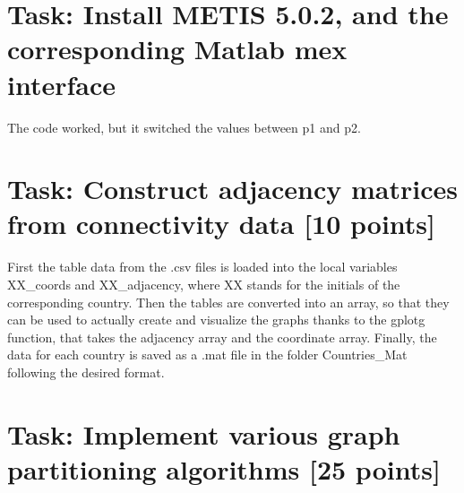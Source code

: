 \documentclass[unicode,11pt,a4paper,oneside,numbers=endperiod,openany]{scrartcl}
\begin{document}
\setassignment
{}

\newline



\section{Task: Install METIS 5.0.2, and the corresponding Matlab mex interface}

The code worked, but it switched the values between p1 and p2.


\section{Task:  Construct adjacency matrices
from connectivity data [10 points]}

First the table data from the .csv files is loaded into the local variables XX\_coords and XX\_adjacency, where XX stands for the initials of the corresponding country. Then the tables are converted into an array, so that they can be used to actually create and visualize the graphs thanks to the gplotg function, that takes the adjacency array and the coordinate array.
\newline
Finally, the data for each country is saved as a .mat file in the folder Countries\_Mat following the desired format.

\section{Task: Implement various graph partitioning algorithms [25 points]}
\end{document}

